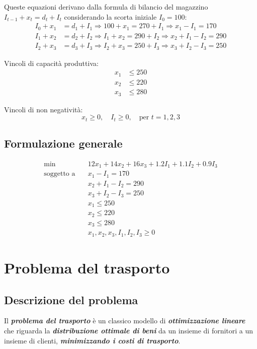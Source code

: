 Queste equazioni derivano dalla formula di bilancio del magazzino $I_{t-1}+x_t=d_t+I_t$
considerando la scorta iniziale $I_0 = 100$:
\begin{align*}
I_0 + x_1 &= d_1 + I_1 \Rightarrow 100 + x_1 = 270 + I_1 \Rightarrow x_1 - I_1 = 170 \\
I_1 + x_2 &= d_2 + I_2 \Rightarrow I_1 + x_2 = 290 + I_2 \Rightarrow x_2 + I_1 - I_2 = 290 \\
I_2 + x_3 &= d_3 + I_3 \Rightarrow I_2 + x_3 = 250 + I_3 \Rightarrow x_3 + I_2 - I_3 = 250
\end{align*}

Vincoli di capacità produttiva:
\[ 
\begin{aligned}
x_1 &\leq 250 \\
x_2 &\leq 220 \\
x_3 &\leq 280
\end{aligned}
\]

Vincoli di non negatività:
\[ 
x_t \geq 0, \quad I_t \geq 0, \quad \text{per } t = 1, 2, 3
\]

\subsection{Formulazione generale}
\[ 
\begin{aligned}
\min \quad & 12x_1 + 14x_2 + 16x_3 + 1.2I_1 + 1.1I_2 + 0.9I_3 \\
\text{soggetto a} \quad 
& x_1 - I_1 = 170 \\
& x_2 + I_1 - I_2 = 290 \\
& x_3 + I_2 - I_3 = 250 \\
& x_1 \leq 250 \\
& x_2 \leq 220 \\
& x_3 \leq 280 \\
& x_1, x_2, x_3, I_1, I_2, I_3 \geq 0
\end{aligned}
\]

\section{Problema del trasporto}
\subsection{Descrizione del problema}
Il \textbf{\textit{problema del trasporto}} è un classico modello di \textbf{\textit{ottimizzazione lineare}} 
che riguarda la \textbf{\textit{distribuzione ottimale di beni}} da un insieme di fornitori 
a un insieme di clienti, \textbf{\textit{minimizzando i costi di trasporto}}.

